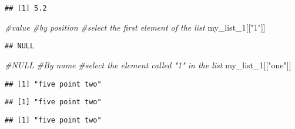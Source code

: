 \documentclass[
]{article}
\newenvironment{Shaded}{\begin{snugshade}}{\end{snugshade}}
\newcommand{\CommentTok}[1]{\textcolor[rgb]{0.56,0.35,0.01}{\textit{#1}}}
\newcommand{\NormalTok}[1]{#1}
\newcommand{\SpecialCharTok}[1]{\textcolor[rgb]{0.00,0.00,0.00}{#1}}
\newcommand{\StringTok}[1]{\textcolor[rgb]{0.31,0.60,0.02}{#1}}
\begin{document}
\begin{verbatim}
## [1] 5.2
\end{verbatim}

\begin{Shaded}
\begin{Highlighting}[]
\CommentTok{\#value}
\CommentTok{\#by position}
\CommentTok{\#select the first element of the list}
\NormalTok{my\_list\_1[[}\StringTok{"1"}\NormalTok{]] }
\end{Highlighting}
\end{Shaded}

\begin{verbatim}
## NULL
\end{verbatim}

\begin{Shaded}
\begin{Highlighting}[]
\CommentTok{\#NULL}
\CommentTok{\#By name}
\CommentTok{\#select the element called "1" in the list}
\NormalTok{my\_list\_1[[}\StringTok{"one"}\NormalTok{]] }
\end{Highlighting}
\end{Shaded}

\begin{verbatim}
## [1] "five point two"
\end{verbatim}

\begin{Shaded}
\end{Shaded}

\begin{verbatim}
## [1] "five point two"
\end{verbatim}

\begin{Shaded}
\end{Shaded}

\begin{verbatim}
## [1] "five point two"
\end{verbatim}

\begin{Shaded}
\end{Shaded}
\end{document}
